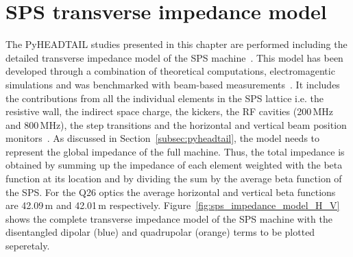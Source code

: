 \section{SPS transverse impedance model}\label{sec:sps_impedance_model}
The PyHEADTAIL studies presented in this chapter are performed including the detailed transverse impedance model of the SPS machine~\cite{sps_impedance_model_git}. This model has been developed through a combination of theoretical computations, electromagentic simulations and was benchmarked with beam-based measurements~\cite{Salvant:1274254, Zannini:1561199, Salvant:1271349, Zannini:2141779}. 
It includes the contributions from all the individual elements in the SPS lattice i.e. the resistive wall, the indirect space charge, the kickers, the RF cavities (200\,MHz and 800\,MHz), the step transitions and the horizontal and vertical beam position monitors~\cite{Zannini:2141779}. As discussed in  Section~\ref{subsec:pyheadtail}, the model needs to represent the global impedance of the full machine. Thus, the total impedance is obtained by summing up the impedance of each element weighted with the beta function at its location and by dividing the sum by the average beta function of the SPS. For the Q26 optics the average horizontal and vertical beta functions are 42.09\,m and 42.01\,m respectively.
Figure~\ref{fig:sps_impedance_model_H_V} shows the complete transverse impedance model of the SPS machine with the disentangled dipolar (blue) and quadrupolar (orange) terms to be plotted seperetaly. 

